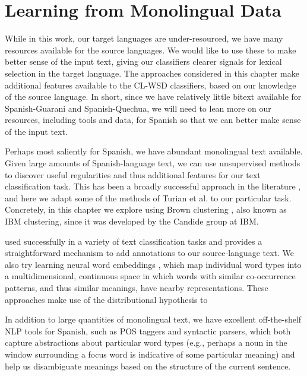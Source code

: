 \chapter{Learning from Monolingual Data}
\label{chap:monolingual}
While in this work, our target languages are under-resourced, we have many
resources available for the source languages. We would like to use these to
make better sense of the input text, giving our classifiers clearer signals for
lexical selection in the target language.
The approaches considered in this chapter make additional features available to
the CL-WSD classifiers, based on our knowledge of the source language.
In short, since we have relatively little bitext available for Spanish-Guarani
and Spanish-Quechua, we will need to lean more on our resources, including
tools and data, for Spanish so that we can better make sense of the input text.

Perhaps most saliently for Spanish, we have abundant monolingual text
available. Given large amounts of Spanish-language text, we can use
unsupervised methods to discover useful regularities and thus additional
features for our text classification task. This has been a broadly successful
approach in the literature \cite{turian-ratinov-bengio:2010:ACL}, and here we
adapt some of the methods of Turian et al. to our particular task. Concretely,
in this chapter we explore using Brown clustering \cite{brown1992class}, also
known as IBM clustering, since it was developed by the Candide group at IBM.

used successfully in a variety of text classification tasks
and provides a straightforward mechanism
to add annotations to our source-language text.  We also try learning neural
word embeddings \cite{mikolovword2vec}, which map individual word types into a
multidimensional, continuous space in which words with similar co-occurrence
patterns, and thus similar meanings, have nearby representations.
These approaches make use of the distributional hypothesis to 


In addition to large quantities of monolingual text, we have excellent
off-the-shelf NLP tools for Spanish, such as POS taggers and syntactic parsers,
which both capture abstractions about particular word types (e.g., perhaps a
noun in the window surrounding a focus word is indicative of some particular
meaning) and help us disambiguate meanings based on the structure of the
current sentence.


